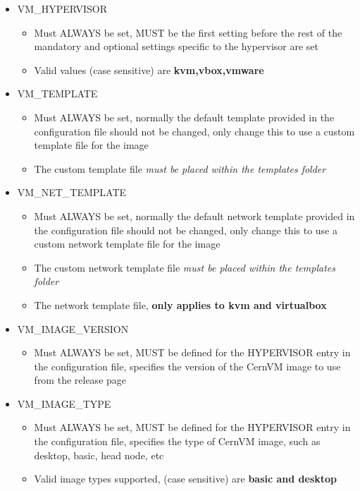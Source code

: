 \begin{itemize}
\item	VM\_HYPERVISOR
		\begin{itemize}
		\item	Must ALWAYS be set, MUST be the first setting before the rest of the mandatory
	  			and optional settings specific to the hypervisor are set
	  	\item	Valid values (case sensitive) are {\bf kvm,vbox,vmware}
		\end{itemize}

\item	VM\_TEMPLATE
		\begin{itemize}
		\item	Must ALWAYS be set, normally the default template provided in the configuration file
				should not be changed, only change this to use a custom template file for the \cernvm 
				image
		\item	The custom template file \emph{must be placed within the templates folder}
		\end{itemize}

\item	VM\_NET\_TEMPLATE
		\begin{itemize}
		\item	Must ALWAYS be set, normally the default network template provided in the configuration file
				should not be changed, only change this to use a custom network template file for the \cernvm 
				image
		\item	The custom network template file \emph{must be placed within the templates folder}
		\item 	The network template file, {\bf only applies to kvm and virtualbox}
		\end{itemize}

\item	VM\_IMAGE\_VERSION
		\begin{itemize}
		\item	Must ALWAYS be set,  MUST be defined for the HYPERVISOR entry in the configuration
				file, specifies the version of the CernVM image to use from the release page
		\end{itemize}
	
\item	VM\_IMAGE\_TYPE
		\begin{itemize}
		\item	Must ALWAYS be set,  MUST be defined for the HYPERVISOR entry in the configuration
				file, specifies the type of CernVM image, such as desktop, basic, head node, etc
		\item	Valid image types supported, (case sensitive) are {\bf basic and desktop}
		\end{itemize}
		

\end{itemize}
